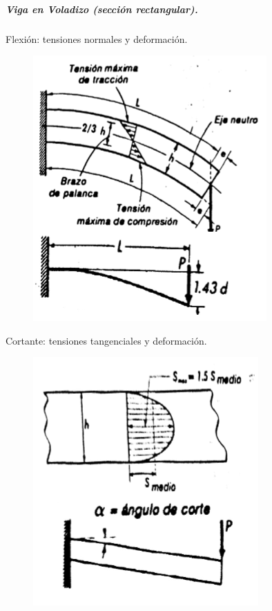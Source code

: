 \subparagraph{Viga en Voladizo (sección rectangular).}
Flexión: tensiones normales y deformación.
\begin{figure}[H]
    \centering
    \includegraphics[width=0.75\linewidth]{Imagenes/Viga en voladizo seccion rectangular - flexion.png}
\end{figure}

Cortante: tensiones tangenciales y deformación.
\begin{figure}[H]
    \centering
    \includegraphics[width=0.75\linewidth]{Imagenes/Viga en voladizo seccion rectangular - Cortante.png}
\end{figure}

